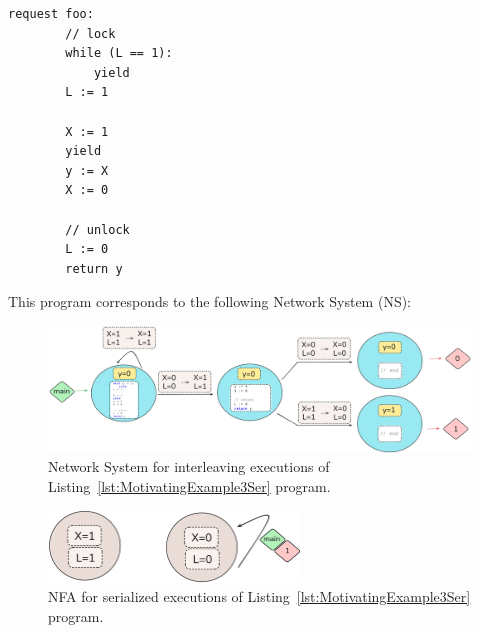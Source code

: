 \begin{minipage}[t]{0.3\textwidth}
	\begin{lstlisting}[caption={With yield and lock (serializable)},
		label={lst:MotivatingExample3SerAgain}]
	request foo: 
		// lock
		while (L == 1): 
			yield
		L := 1 
		
		X := 1
		yield
		y := X 
		X := 0
		
		// unlock    
		L := 0
		return y 
	\end{lstlisting}
\end{minipage}

This program corresponds to the following Network System (NS):

\begin{figure}[htbp]
	\centering
	\includegraphics[width=1.1\textwidth]{plots/code_3_NS.png}
	\caption{Network System for interleaving executions of Listing~\ref{lst:MotivatingExample3Ser} program.}
	\label{fig:code3ExampleNS}
\end{figure}


\begin{figure}[htbp]
	\centering
	\includegraphics[width=0.6\textwidth]{plots/code_3_NFA.png}
	\caption{NFA for serialized executions of Listing~\ref{lst:MotivatingExample3Ser} program.}
	\label{fig:code3ExampleNFA}
\end{figure}



